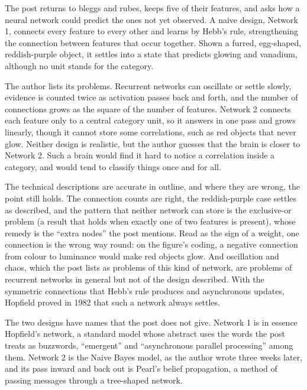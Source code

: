 \begin{afterword}
\summaryhead

The post returns to bleggs and rubes, keeps five of their features, and asks how a neural network could predict the ones not yet observed. A naive design, Network 1, connects every feature to every other and learns by Hebb's rule, strengthening the connection between features that occur together. Shown a furred, egg-shaped, reddish-purple object, it settles into a state that predicts glowing and vanadium, although no unit stands for the category.

The author lists its problems. Recurrent networks can oscillate or settle slowly, evidence is counted twice as activation passes back and forth, and the number of connections grows as the square of the number of features. Network 2 connects each feature only to a central category unit, so it answers in one pass and grows linearly, though it cannot store some correlations, such as red objects that never glow. Neither design is realistic, but the author guesses that the brain is closer to Network 2. Such a brain would find it hard to notice a correlation inside a category, and would tend to classify things once and for all.

\responsehead

The technical descriptions are accurate in outline, and where they are wrong, the point still holds. The connection counts are right, the reddish-purple case settles as described, and the pattern that neither network can store is the exclusive-or problem (a result that holds when exactly one of two features is present), whose remedy is the ``extra nodes'' the post mentions. Read as the sign of a weight, one connection is the wrong way round: on the figure's coding, a negative connection from colour to luminance would make red objects glow. And oscillation and chaos, which the post lists as problems of this kind of network, are problems of recurrent networks in general but not of the design described. With the symmetric connections that Hebb's rule produces and asynchronous updates, Hopfield proved in 1982 that such a network always settles.

The two designs have names that the post does not give. Network 1 is in essence Hopfield's network, a standard model whose abstract uses the words the post treats as buzzwords, ``emergent'' and ``asynchronous parallel processing'' among them. Network 2 is the Naive Bayes model, as the author wrote three weeks later, and its pass inward and back out is Pearl's belief propagation, a method of passing messages through a tree-shaped network.


\end{afterword}

